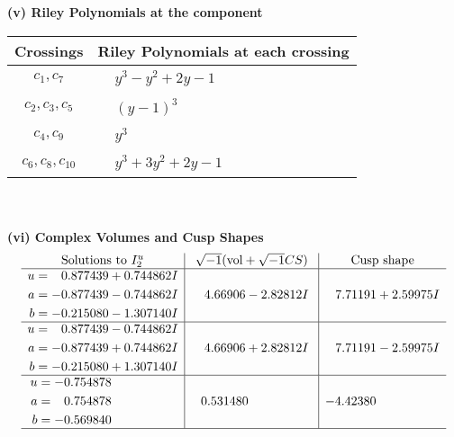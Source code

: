 \documentclass[1p]{elsarticle_modified}
\theoremstyle{definition}
\newcommand{\I}{\sqrt{-1}}
\begin{document}
\flushleft \textbf{(v) Riley Polynomials at the component}\newline \\
\begin{tabular}{m{50pt}|m{274pt}}
Crossings & \hspace{64pt}Riley Polynomials at each crossing \\
\hline $$\begin{aligned}c_{1},c_{7}\end{aligned}$$&$\begin{aligned}
&y^3- y^2+2 y-1
\end{aligned}$\\
\hline $$\begin{aligned}c_{2},c_{3},c_{5}\end{aligned}$$&$\begin{aligned}
&(y-1)^3
\end{aligned}$\\
\hline $$\begin{aligned}c_{4},c_{9}\end{aligned}$$&$\begin{aligned}
&y^3
\end{aligned}$\\
\hline $$\begin{aligned}c_{6},c_{8},c_{10}\end{aligned}$$&$\begin{aligned}
&y^3+3 y^2+2 y-1
\end{aligned}$\\
\hline
\end{tabular}\\~\\
\newpage\flushleft \textbf{(vi) Complex Volumes and Cusp Shapes}
$$\begin{array}{c|c|c}  
\text{Solutions to }I^u_{2}& \I (\text{vol} + \sqrt{-1}CS) & \text{Cusp shape}\\
 \hline 
\begin{aligned}
u &= \phantom{-}0.877439 + 0.744862 I \\
a &= -0.877439 - 0.744862 I \\
b &= -0.215080 - 1.307140 I\end{aligned}
 & \phantom{-}4.66906 - 2.82812 I & \phantom{-}7.71191 + 2.59975 I \\ \hline\begin{aligned}
u &= \phantom{-}0.877439 - 0.744862 I \\
a &= -0.877439 + 0.744862 I \\
b &= -0.215080 + 1.307140 I\end{aligned}
 & \phantom{-}4.66906 + 2.82812 I & \phantom{-}7.71191 - 2.59975 I \\ \hline\begin{aligned}
u &= -0.754878\phantom{ +0.000000I} \\
a &= \phantom{-}0.754878\phantom{ +0.000000I} \\
b &= -0.569840\phantom{ +0.000000I}\end{aligned}
 & \phantom{-}0.531480\phantom{ +0.000000I} & -4.42380\phantom{ +0.000000I}\\
 \hline 
 \end{array}$$\newpage
\end{document}
